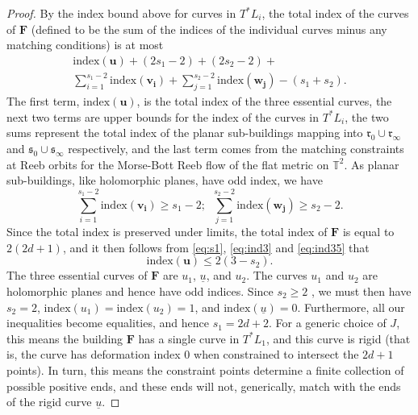 \documentclass[12pt]{amsart}
\theoremstyle{definition}
\begin{document}
\begin{proof}
By the index bound above for curves in $T^*L_i$, the total index of the curves of $\mathbf{F}$ (defined to be the sum of the indices of the individual curves minus any matching conditions) is at most \begin{equation}\label{eq:ind3}
\begin{split}
   \mathrm{index}(\mathbf{u}) + (2s_1-2) + (2s_2-2)+ \\
   \sum_{i=1}^{s_1-2}\mathrm{index}(\mathbf{v_i}) + \sum_{j=1}^{s_2-2}\mathrm{index}(\mathbf{w_j}) - (s_1 +s_2). 
\end{split}
\end{equation}
The first term, $\mathrm{index}(\mathbf{u})$, is the total index of the three essential curves, the next two terms are upper bounds for the index of the curves in $T^*L_i$, the two sums represent the total index of the planar sub-buildings mapping into $\mathfrak{r}_0 \cup \mathfrak{r}_\infty$ and $\mathfrak{s}_0 \cup \mathfrak{s}_\infty$ respectively, and the last term %
comes from the matching constraints at Reeb orbits for the Morse-Bott Reeb flow of the flat metric on $\mathbb{T}^2$. 
As planar sub-buildings, like holomorphic planes, have odd index, we have
\begin{equation}\label{eq:ind35}
   \sum_{i=1}^{s_1-2}\mathrm{index}(\mathbf{v_i}) \geq s_1 -2; \, \, \,  \sum_{j=1}^{s_2-2}\mathrm{index}(\mathbf{w_j}) \geq s_2 -2.
\end{equation}
Since the total index is preserved under limits, the total index of $\mathbf{F}$ is equal to $2(2d+1)$, and it then follows from \eqref{eq:s1}, \eqref{eq:ind3} and  \eqref{eq:ind35} that 
\begin{equation}\label{eq:ind4}
   \mathrm{index}(\mathbf{u}) \leq 2(3-s_2). 
\end{equation}
The three essential curves of $\mathbf{F}$ are $u_1$, $\underline{u}$,  and $u_2$. The curves $u_1$ and $u_2$ are holomorphic planes and hence have odd indices. Since $s_2 \ge 2$ , we must  then have $s_2=2$, $\mathrm{index}(u_1) = \mathrm{index}(u_2) =1$, and 
$\mathrm{index}(\underline{u})=0$. Furthermore, all our inequalities become equalities, and hence $s_1 = 2d+2$. For a generic choice of $J$, %
this means the building $\mathbf{F}$ has a single curve in $T^*L_1$, and this curve is rigid (that is, the curve has deformation index $0$ when constrained to intersect the $2d+1$ points). In turn, this means the constraint points determine a finite collection of possible positive ends, and these ends will not, generically,  match with the ends of the rigid curve $\underline{u}$.


\end{proof}
\end{document}
